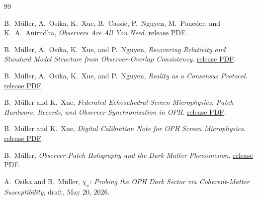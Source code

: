 \documentclass[11pt]{article}
\numberwithin{equation}{section}
\theoremstyle{remark}
\newcommand{\chinu}{\chi_\nu}
\begin{document}
\begin{thebibliography}{99}

B.\ M\"uller, A.\ Osika, K.\ Xue, B.\ Cassie, P.\ Nguyen, M.\ Poneder, and K.\ A.\ Anirudha,
\emph{Observers Are All You Need}.
\href{https://github.com/FloatingPragma/observer-patch-holography/releases/download/\OPHPaperReleaseID/observers_are_all_you_need.pdf}{release PDF}.

B.\ M\"uller, A.\ Osika, K.\ Xue, and P.\ Nguyen,
\emph{Recovering Relativity and Standard Model Structure from Observer-Overlap Consistency}.
\href{https://github.com/FloatingPragma/observer-patch-holography/releases/download/\OPHPaperReleaseID/recovering_relativity_and_standard_model_structure_from_observer_overlap_consistency_compact.pdf}{release PDF}.

B.\ M\"uller, A.\ Osika, K.\ Xue, and P.\ Nguyen,
\emph{Reality as a Consensus Protocol}.
\href{https://github.com/FloatingPragma/observer-patch-holography/releases/download/\OPHPaperReleaseID/reality_as_consensus_protocol.pdf}{release PDF}.

B.\ M\"uller and K.\ Xue,
\emph{Federated Echosahedral Screen Microphysics: Patch Hardware, Records, and Observer Synchronization in OPH}.
\href{https://github.com/FloatingPragma/observer-patch-holography/releases/download/\OPHPaperReleaseID/screen_microphysics_and_observer_synchronization.pdf}{release PDF}.

B.\ M\"uller and K.\ Xue,
\emph{Digital Calibration Note for OPH Screen Microphysics}.
\href{https://github.com/FloatingPragma/observer-patch-holography/releases/download/\OPHPaperReleaseID/screen_microphysics_digital_calibration_note.pdf}{release PDF}.

B.\ M\"uller,
\emph{Observer-Patch Holography and the Dark Matter Phenomenon}.
\href{https://github.com/FloatingPragma/observer-patch-holography/releases/download/\OPHPaperReleaseID/oph_dark_matter_paper.pdf}{release PDF}.

A.\ Osika and B.\ M\"uller,
\emph{\(\chinu\): Probing the OPH Dark Sector via Coherent-Matter Susceptibility},
draft, May 20, 2026.

\end{thebibliography}
\end{document}
